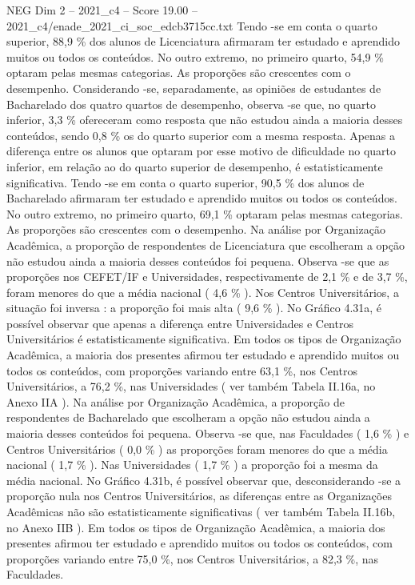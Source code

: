 \begin{textsample}{NEG Dim 2 – 2021\_c4 – Score 19.00 – 2021\_c4/enade\_2021\_ci\_soc\_edcb3715cc.txt}
Tendo -se em conta o quarto superior, 88,9 \% dos alunos de Licenciatura afirmaram ter estudado e aprendido muitos ou todos os conteúdos.
No outro extremo, no primeiro quarto, 54,9 \% optaram pelas mesmas categorias.
As proporções são crescentes com o desempenho.
Considerando -se, separadamente, as opiniões de estudantes de Bacharelado dos quatro quartos de desempenho, observa -se que, no quarto inferior, 3,3 \% ofereceram como resposta que não estudou ainda a maioria desses conteúdos, sendo 0,8 \% os do quarto superior com a mesma resposta.
Apenas a diferença entre os alunos que optaram por esse motivo de dificuldade no quarto inferior, em relação ao do quarto superior de desempenho, é estatisticamente significativa.
Tendo -se em conta o quarto superior, 90,5 \% dos alunos de Bacharelado afirmaram ter estudado e aprendido muitos ou todos os conteúdos.
No outro extremo, no primeiro quarto, 69,1 \% optaram pelas mesmas categorias.
As proporções são crescentes com o desempenho.
Na análise por Organização Acadêmica, a proporção de respondentes de Licenciatura que escolheram a opção não estudou ainda a maioria desses conteúdos foi pequena.
Observa -se que as proporções nos CEFET/IF e Universidades, respectivamente de 2,1 \% e de 3,7 \%, foram menores do que a média nacional ( 4,6 \% ).
Nos Centros Universitários, a situação foi inversa : a proporção foi mais alta ( 9,6 \% ).
No Gráfico 4.31a, é possível observar que apenas a diferença entre Universidades e Centros Universitários é estatisticamente significativa.
Em todos os tipos de Organização Acadêmica, a maioria dos presentes afirmou ter estudado e aprendido muitos ou todos os conteúdos, com proporções variando entre 63,1 \%, nos Centros Universitários, a 76,2 \%, nas Universidades ( ver também Tabela II.16a, no Anexo IIA ).
Na análise por Organização Acadêmica, a proporção de respondentes de Bacharelado que escolheram a opção não estudou ainda a maioria desses conteúdos foi pequena.
Observa -se que, nas Faculdades ( 1,6 \% ) e Centros Universitários ( 0,0 \% ) as proporções foram menores do que a média nacional ( 1,7 \% ).
Nas Universidades ( 1,7 \% ) a proporção foi a mesma da média nacional.
No Gráfico 4.31b, é possível observar que, desconsiderando -se a proporção nula nos Centros Universitários, as diferenças entre as Organizações Acadêmicas não são estatisticamente significativas ( ver também Tabela II.16b, no Anexo IIB ).
Em todos os tipos de Organização Acadêmica, a maioria dos presentes afirmou ter estudado e aprendido muitos ou todos os conteúdos, com proporções variando entre 75,0 \%, nos Centros Universitários, a 82,3 \%, nas Faculdades.

\end{textsample}
